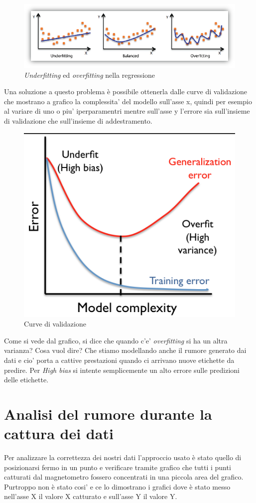 \begin{figure}[H]
	\centering
	\includegraphics[width=1\linewidth]{img/underfittingoverfitting}
	\caption{\textit{Underfitting} ed \textit{overfitting} nella regressione}
	\label{fig:underfittingoverfitting}
\end{figure}

Una soluzione a questo problema \`e possibile ottenerla dalle curve di validazione che mostrano a grafico la complessita' del modello sull'asse x, quindi per esempio al variare di uno o piu' iperparamentri mentre sull'asse y l'errore sia sull'insieme di validazione che sull'insieme di addestramento.

\begin{figure}[H]
	\centering
	\includegraphics[width=0.7\linewidth]{img/validation_curve}
	\caption{Curve di validazione}
	\label{fig:validationcurve}
\end{figure}

Come si vede dal grafico, si dice che quando c'e' \textit{overfitting} si ha un altra varianza? Cosa vuol dire? Che stiamo modellando anche il rumore generato dai dati e cio' porta a cattive prestazioni quando ci arrivano nuove etichette da predire. Per \textit{High bias} si intente semplicemente un alto errore sulle predizioni delle etichette.
\section{Analisi del rumore durante la cattura dei dati}
Per analizzare la correttezza dei nostri dati l'approccio usato \`e stato quello di posizionarsi fermo in un punto e verificare tramite grafico che tutti i punti catturati dal magnetometro fossero concentrati in una piccola area del grafico. Purtroppo non \`e stato cosi' e ce lo dimostrano i grafici dove \`e stato messo nell'asse X il valore X catturato e sull'asse Y il valore Y.

